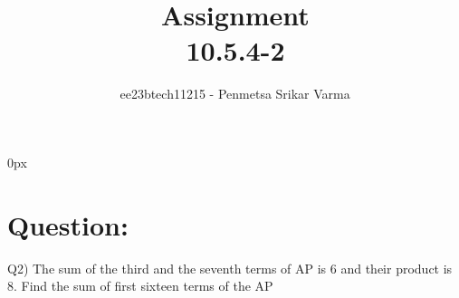 \documentclass[beamer]{IEEEtran}
\theoremstyle{remark}
\begin{document}
\parindent 0px


\title{Assignment\\[1ex]10.5.4-2}
\author{ee23btech11215 - Penmetsa Srikar Varma$^{}$%
}
\maketitle
\newpage
\bigskip

\renewcommand{\thefigure}{\theenumi}
\renewcommand{\thetable}{\theenumi}
\section*{Question:}
Q2) The sum of the third and the seventh terms of AP is 6 and their product is 8. Find the sum of first sixteen terms of the AP\\
\end{document}
